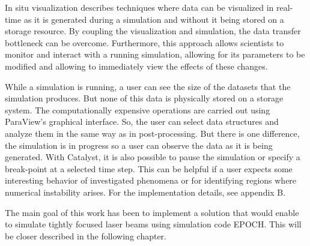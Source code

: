 In situ visualization describes techniques where data can be visualized in real-time as it is generated during a simulation and without it being stored on a storage resource. By coupling the visualization and simulation, the data transfer bottleneck can be overcome. Furthermore, this approach allows scientists to monitor and interact with a running simulation, allowing for its parameters to be modified and allowing to immediately view the effects of these changes.

While a simulation is running, a user can see the size of the datasets that the simulation produces. But none of this data is physically stored on a storage system. The computationally expensive operations are carried out using ParaView’s graphical interface. So, the user can select data structures and analyze them in the same way as in post-processing. But there is one difference, the simulation is in progress so a user can observe the data as it is being generated. With Catalyst, it is also possible to pause the simulation or specify a break-point at a selected time step. This can be helpful if a user expects some interesting behavior of investigated phenomena or for identifying regions where numerical instability arises. For the implementation details, see appendix B.

The main goal of this work has been to implement a solution that would enable to simulate tightly focused laser beams using simulation code EPOCH. This will be closer described in the following chapter.


